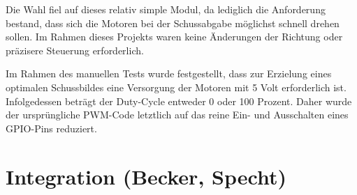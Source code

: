 Die Wahl fiel auf dieses relativ simple Modul, da lediglich die Anforderung bestand, dass sich die Motoren bei der Schussabgabe möglichst schnell drehen sollen.
Im Rahmen dieses Projekts waren keine Änderungen der Richtung oder präzisere Steuerung erforderlich.

Im Rahmen des manuellen Tests wurde festgestellt, dass zur Erzielung eines optimalen Schussbildes eine Versorgung der Motoren mit 5 Volt erforderlich ist. 
Infolgedessen beträgt der Duty-Cycle entweder 0 oder 100 Prozent.
Daher wurde der ursprüngliche PWM-Code letztlich auf das reine Ein- und Ausschalten eines GPIO-Pins reduziert.

\section{Integration (Becker, Specht)}